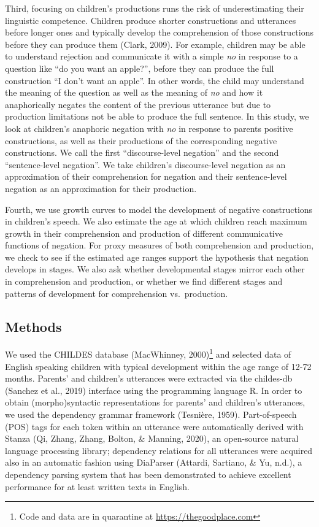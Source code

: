 \documentclass[
  man,floatsintext]{apa6}
\begin{document}
Third, focusing on children's productions runs the risk of underestimating their linguistic competence. Children produce shorter constructions and utterances before longer ones and typically develop the comprehension of those constructions before they can produce them (Clark, 2009). For example, children may be able to understand rejection and communicate it with a simple \emph{no} in response to a question like ``do you want an apple?'', before they can produce the full construction ``I don't want an apple''. In other words, the child may understand the meaning of the question as well as the meaning of \emph{no} and how it anaphorically negates the content of the previous utterance but due to production limitations not be able to produce the full sentence. In this study, we look at children's anaphoric negation with \emph{no} in response to parents positive constructions, as well as their productions of the corresponding negative constructions. We call the first ``discourse-level negation'' and the second ``sentence-level negation''. We take children's discourse-level negation as an approximation of their comprehension for negation and their sentence-level negation as an approximation for their production.

Fourth, we use growth curves to model the development of negative constructions in children's speech. We also estimate the age at which children reach maximum growth in their comprehension and production of different communicative functions of negation. For proxy measures of both comprehension and production, we check to see if the estimated age ranges support the hypothesis that negation develops in stages. We also ask whether developmental stages mirror each other in comprehension and production, or whether we find different stages and patterns of development for comprehension vs.~production.

\subsection{Methods}\label{methods}

We used the CHILDES database (MacWhinney, 2000)\footnote{Code and data are in quarantine at \url{https://thegoodplace.com}} and selected data of English speaking children with typical development within the age range of 12-72 months. Parents' and children's utterances were extracted via the childes-db (Sanchez et al., 2019) interface using the programming language R. In order to obtain (morpho)syntactic representations for parents' and children's utterances, we used the dependency grammar framework (Tesnière, 1959). Part-of-speech (POS) tags for each token within an utterance were automatically derived with Stanza (Qi, Zhang, Zhang, Bolton, \& Manning, 2020), an open-source natural language processing library; dependency relations for all utterances were acquired also in an automatic fashion using DiaParser (Attardi, Sartiano, \& Yu, n.d.), a dependency parsing system that has been demonstrated to achieve excellent performance for at least written texts in English.
\end{document}
